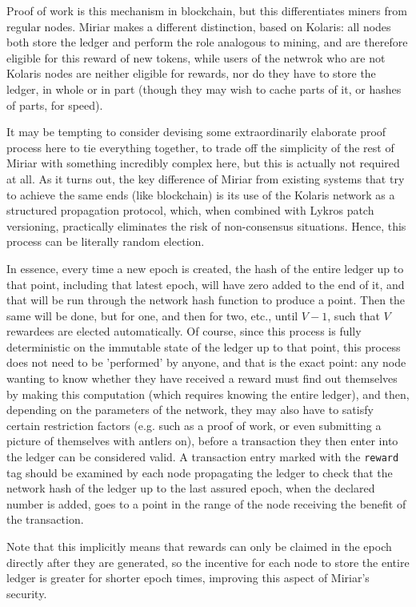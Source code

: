 \documentclass{extreport}
\begin{document}
Proof of work is this mechanism in blockchain, but this differentiates miners from regular nodes. Miriar makes a different distinction, based on Kolaris: all nodes both store the ledger and perform the role analogous to mining, and are therefore eligible for this reward of new tokens, while users of the netwrok who are not Kolaris nodes are neither eligible for rewards, nor do they have to store the ledger, in whole or in part (though they may wish to cache parts of it, or hashes of parts, for speed).

It may be tempting to consider devising some extraordinarily elaborate proof process here to tie everything together, to trade off the simplicity of the rest of Miriar with something incredibly complex here, but this is actually not required at all. As it turns out, the key difference of Miriar from existing systems that try to achieve the same ends (like blockchain) is its use of the Kolaris network as a structured propagation protocol, which, when combined with Lykros patch versioning, practically eliminates the risk of non-consensus situations. Hence, this process can be literally random election.

In essence, every time a new epoch is created, the hash of the entire ledger up to that point, including that latest epoch, will have zero added to the end of it, and that will be run through the network hash function to produce a point. Then the same will be done, but for one, and then for two, etc., until \(V - 1\), such that \(V\) rewardees are elected automatically. Of course, since this process is fully deterministic on the immutable state of the ledger up to that point, this process does not need to be 'performed' by anyone, and that is the exact point: any node wanting to know whether they have received a reward must find out themselves by making this computation (which requires knowing the entire ledger), and then, depending on the parameters of the network, they may also have to satisfy certain restriction factors (e.g. such as a proof of work, or even submitting a picture of themselves with antlers on), before a transaction they then enter into the ledger can be considered valid. A transaction entry marked with the \texttt{reward} tag should be examined by each node propagating the ledger to check that the network hash of the ledger up to the last assured epoch, when the declared number is added, goes to a point in the range of the node receiving the benefit of the transaction.

Note that this implicitly means that rewards can only be claimed in the epoch directly after they are generated, so the incentive for each node to store the entire ledger is greater for shorter epoch times, improving this aspect of Miriar's security.
\end{document}
